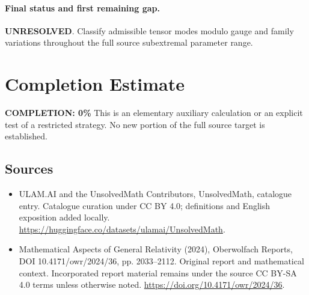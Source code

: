 \documentclass[11pt]{article}
\begin{document}
\paragraph{Final status and first remaining gap.}
\textbf{UNRESOLVED}. Classify admissible tensor modes modulo gauge and family variations throughout the full source subextremal parameter range.

\section{Completion Estimate}
\noindent\textbf{COMPLETION: 0\%}
This is an elementary auxiliary calculation or an explicit test of a restricted strategy. No new portion of the full source target is established.

\subsection{Sources}
\begin{itemize}
\item[\hypertarget{source:statement:1}{S1}] ULAM.AI and the UnsolvedMath Contributors, UnsolvedMath, catalogue entry. Catalogue curation under CC BY 4.0; definitions and English exposition added locally.
\url{https://huggingface.co/datasets/ulamai/UnsolvedMath}.
\item[\hypertarget{source:statement:2}{S2}] Mathematical Aspects of General Relativity (2024), Oberwolfach Reports, DOI 10.4171/owr/2024/36, pp. 2033--2112. Original report and mathematical context. Incorporated report material remains under the source CC BY-SA 4.0 terms unless otherwise noted.
\url{https://doi.org/10.4171/owr/2024/36}.
\end{itemize}
\label{end:statement}
\end{document}
